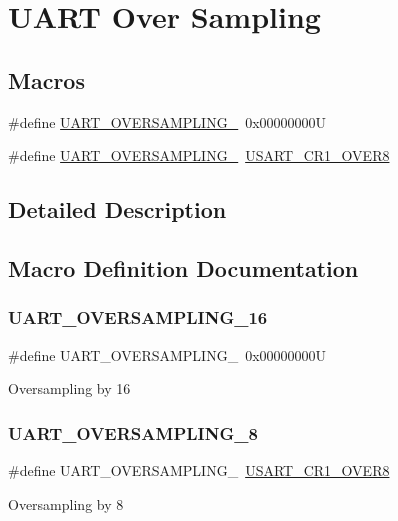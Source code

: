\hypertarget{group___u_a_r_t___over___sampling}{}\section{U\+A\+RT Over Sampling}
\label{group___u_a_r_t___over___sampling}
\subsection*{Macros}
\begin{DoxyCompactItemize}
\item 
\#define \mbox{\hyperlink{group___u_a_r_t___over___sampling_gaa6a320ec65d248d76f21de818db1a2f0}{U\+A\+R\+T\+\_\+\+O\+V\+E\+R\+S\+A\+M\+P\+L\+I\+N\+G\+\_}}~0x00000000U
\item 
\#define \mbox{\hyperlink{group___u_a_r_t___over___sampling_gaeb13896e8bdc1bb041e01a86a868ee0b}{U\+A\+R\+T\+\_\+\+O\+V\+E\+R\+S\+A\+M\+P\+L\+I\+N\+G\+\_}}~\mbox{\hyperlink{group___peripheral___registers___bits___definition_gaed6caeb0cb48f1a7b34090f31a92a8e2}{U\+S\+A\+R\+T\+\_\+\+C\+R1\+\_\+\+O\+V\+E\+R8}}
\end{DoxyCompactItemize}


\subsection{Detailed Description}


\subsection{Macro Definition Documentation}
\mbox{\label{group___u_a_r_t___over___sampling_gaa6a320ec65d248d76f21de818db1a2f0}} 
\subsubsection{\texorpdfstring{UART\_OVERSAMPLING\_16}{UART\_OVERSAMPLING\_16}}
{\footnotesize\ttfamily \#define U\+A\+R\+T\+\_\+\+O\+V\+E\+R\+S\+A\+M\+P\+L\+I\+N\+G\+\_~0x00000000U}

Oversampling by 16 \mbox{\label{group___u_a_r_t___over___sampling_gaeb13896e8bdc1bb041e01a86a868ee0b}} 
\subsubsection{\texorpdfstring{UART\_OVERSAMPLING\_8}{UART\_OVERSAMPLING\_8}}
{\footnotesize\ttfamily \#define U\+A\+R\+T\+\_\+\+O\+V\+E\+R\+S\+A\+M\+P\+L\+I\+N\+G\+\_~\mbox{\hyperlink{group___peripheral___registers___bits___definition_gaed6caeb0cb48f1a7b34090f31a92a8e2}{U\+S\+A\+R\+T\+\_\+\+C\+R1\+\_\+\+O\+V\+E\+R8}}}

Oversampling by 8 